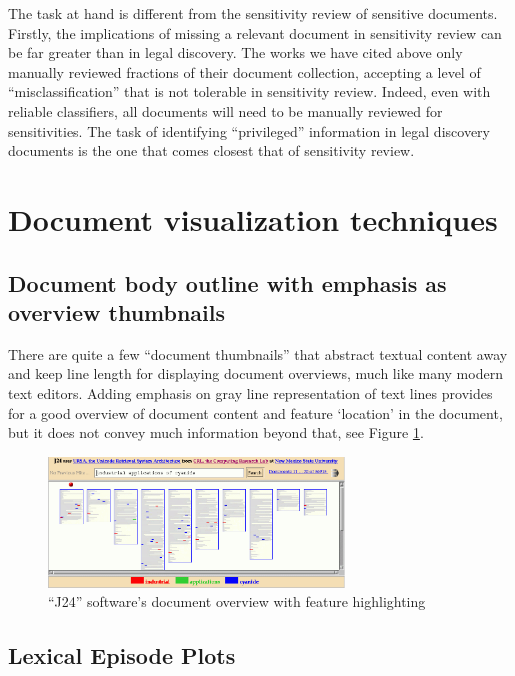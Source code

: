 \documentclass{l4proj}
\begin{document}
The task at hand is different from the sensitivity review of sensitive documents. 
Firstly, the implications of missing a relevant document in sensitivity review can be far greater than in legal discovery. 
The works we have cited above only manually reviewed fractions of their document collection, accepting a level of ``misclassification'' that is not tolerable in sensitivity review. 
Indeed, even with reliable classifiers, all documents will need to be manually reviewed for sensitivities.
The task of identifying ``privileged'' information in legal discovery documents is the one that comes closest that of sensitivity review.

\section{Document visualization techniques}

\subsection{Document body outline with emphasis as overview thumbnails}

There are quite a few ``document thumbnails'' that abstract textual content away and keep line length for displaying document overviews, much like many modern text editors. Adding emphasis on gray line representation of text lines provides for a good overview of document content and feature `location' in the document, but it does not convey much information beyond that, see Figure \ref{fig:j24}.

\begin{figure}[H]
    \centering
    \includegraphics[width=0.7\textwidth]{images/document_visualization/j24.png}
    \caption{``J24'' software's document overview with feature highlighting \\ \protect\autocite{ogdenDocumentThumbnailVisualizations1998a}}
    \label{fig:j24}
\end{figure}

\subsection{Lexical Episode Plots}
\end{document}
